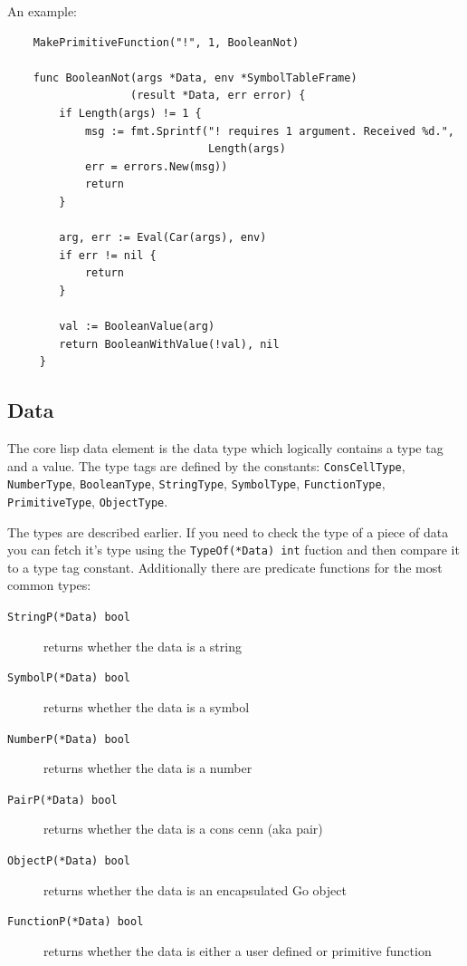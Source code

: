 \documentclass[12pt]{article}
\begin{document}
\noindent An example:

\begin{verbatim}
    MakePrimitiveFunction("!", 1, BooleanNot)

    func BooleanNot(args *Data, env *SymbolTableFrame) 
                   (result *Data, err error) {
        if Length(args) != 1 {
            msg := fmt.Sprintf("! requires 1 argument. Received %d.", 
                               Length(args)
            err = errors.New(msg))
            return
        }

        arg, err := Eval(Car(args), env)
        if err != nil {
            return
        }

        val := BooleanValue(arg)
        return BooleanWithValue(!val), nil
     }
\end{verbatim}

\subsection{Data}

The core lisp data element is the data type which logically
contains a type tag and a value. The type tags are defined by the
constants: \verb|ConsCellType|, \verb|NumberType|, \verb|BooleanType|,
\verb|StringType|, \verb|SymbolType|, \verb|FunctionType|,
\verb|PrimitiveType|, \verb|ObjectType|.

\noindent The types are described earlier. If you need to check the
type of a piece of data you can fetch it's type using the
\verb|TypeOf(*Data) int| fuction and then compare it to a type tag
constant. Additionally there are predicate functions for the most
common types: 

\begin{description}
\item [{\tt StringP(*Data) bool}] returns whether the data is a string
\item [{\tt SymbolP(*Data) bool}] returns whether the data is a symbol
\item [{\tt NumberP(*Data) bool}] returns whether the data is a number
\item [{\tt PairP(*Data) bool}] returns whether the data is a cons cenn
  (aka pair)
\item [{\tt ObjectP(*Data) bool}] returns whether the data is an
  encapsulated Go object 
\item [{\tt FunctionP(*Data) bool}] returns whether the data is either
  a user defined or primitive function
\end{description}
\end{document}
